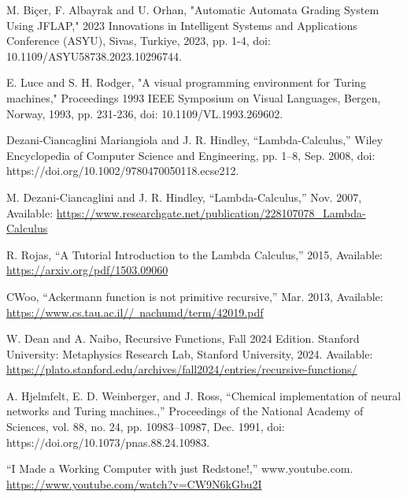 \documentclass[12pt]{report} %
\begin{document}
\begin{singlespace}
\begin{thebibliography}{}
             M. Biçer, F. Albayrak and U. Orhan, "Automatic Automata Grading System Using JFLAP," 2023 Innovations in Intelligent Systems and Applications Conference (ASYU), Sivas, Turkiye, 2023, pp. 1-4, doi: 10.1109/ASYU58738.2023.10296744.

             E. Luce and S. H. Rodger, "A visual programming environment for Turing machines," Proceedings 1993 IEEE Symposium on Visual Languages, Bergen, Norway, 1993, pp. 231-236, doi: 10.1109/VL.1993.269602.
            
             Dezani‐Ciancaglini Mariangiola and J. R. Hindley, “Lambda-Calculus,” Wiley Encyclopedia of Computer Science and Engineering, pp. 1–8, Sep. 2008, doi: https://doi.org/10.1002/9780470050118.ecse212.

             M. Dezani-Ciancaglini and J. R. Hindley, “Lambda-Calculus,” Nov. 2007, Available: \href{https://www.researchgate.net/publication/228107078_Lambda-Calculus}{https://www.researchgate.net/publication/228107078\_Lambda-Calculus}

             R. Rojas, “A Tutorial Introduction to the Lambda Calculus,” 2015, Available: \href{https://arxiv.org/pdf/1503.09060}{https://arxiv.org/pdf/1503.09060}

             CWoo, “Ackermann function is not primitive recursive,” Mar. 2013, Available: \href{https://www.cs.tau.ac.il//~nachumd/term/42019.pdf}{https://www.cs.tau.ac.il//~nachumd/term/42019.pdf}
        
             W. Dean and A. Naibo, Recursive Functions, Fall 2024 Edition. Stanford University: Metaphysics Research Lab, Stanford University, 2024. Available: \href{https://plato.stanford.edu/archives/fall2024/entries/recursive-functions/}{https://plato.stanford.edu/archives/fall2024/entries/recursive-functions/}
        
             A. Hjelmfelt, E. D. Weinberger, and J. Ross, “Chemical implementation of neural networks and Turing machines.,” Proceedings of the National Academy of Sciences, vol. 88, no. 24, pp. 10983–10987, Dec. 1991, doi: https://doi.org/10.1073/pnas.88.24.10983.

             “I Made a Working Computer with just Redstone!,” www.youtube.com. \href{https://www.youtube.com/watch?v=CW9N6kGbu2I}{https://www.youtube.com/watch?v=CW9N6kGbu2I}


\end{thebibliography}
\end{singlespace}
\end{document}
